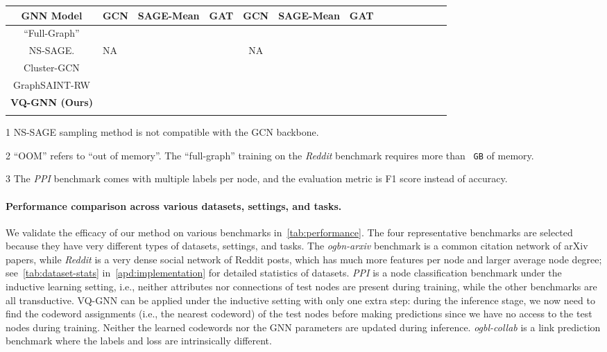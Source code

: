 \documentclass{article}
\newcommand{\cm}{\paragraph}
\newcommand{\siunit}[2]{\texttt{ #2}}
\begin{document}
\begin{table}[t]
{\begin{threeparttable}
\begin{tabular}{Sl| Sc Sc Sc Sc Sc Sc}
GNN Model               & GCN & SAGE-Mean & GAT & GCN & SAGE-Mean & GAT \\ \midrule
``Full-Graph''          &  &  &  &  &   &  \\  \midrule
NS-SAGE.                & NA &  &  & NA &  &  \\
Cluster-GCN             &  &  &  &  &  &  \\
GraphSAINT-RW           &  &  &  &  &  &  \\  \midrule
\textbf{VQ-GNN (Ours)}  &  &  &  &  &  &  \\  \bottomrule
\end{tabular}
\appto\TPTnoteSettings{\normalsize}
\begin{tablenotes}[para]
    \item[1] NS-SAGE sampling method is not compatible with the GCN backbone.
    \item[2] ``OOM'' refers to ``out of memory''. The ``full-graph'' training on the \textit{Reddit} benchmark requires more than \siunit{11}{GB} of memory.
    \item[3] The \textit{PPI} benchmark comes with multiple labels per node, and the evaluation metric is F1 score instead of accuracy.
\end{tablenotes}
\end{threeparttable}}
\vspace{-5pt}
\end{table}

\cm{Performance comparison across various datasets, settings, and tasks.}
We validate the efficacy of our method on various benchmarks in~\cref{tab:performance}. The four representative benchmarks are selected because they have very different types of datasets, settings, and tasks. The \textit{ogbn-arxiv} benchmark is a common citation network of arXiv papers, while \textit{Reddit} is a very dense social network of Reddit posts, which has much more features per node and larger average node degree; see~\cref{tab:dataset-stats} in~\cref{apd:implementation} for detailed statistics of datasets. \textit{PPI} is a node classification benchmark under the inductive learning setting, i.e., neither attributes nor connections of test nodes are present during training, while the other benchmarks are all transductive. VQ-GNN can be applied under the inductive setting with only one extra step: during the inference stage, we now need to find the codeword assignments (i.e., the nearest codeword) of the test nodes before making predictions since we have no access to the test nodes during training. Neither the learned codewords nor the GNN parameters are updated during inference. \textit{ogbl-collab} is a link prediction benchmark where the labels and loss are intrinsically different.
\end{document}
